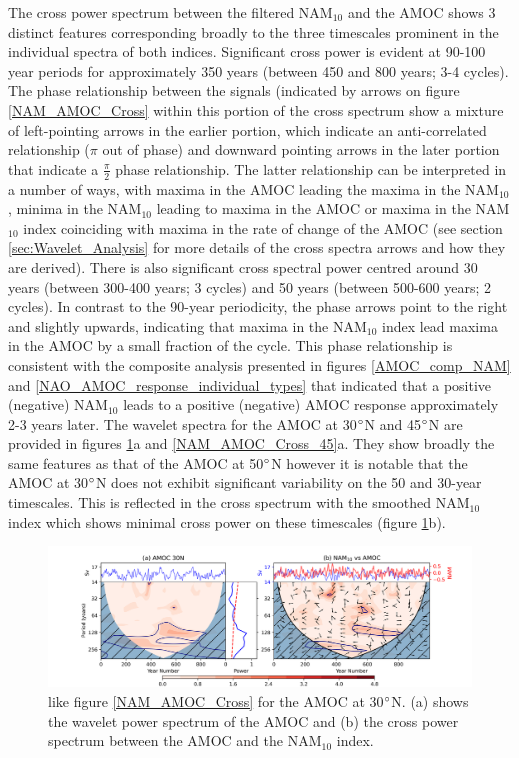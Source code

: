 The cross power spectrum between the filtered NAM$_{10}$ and the AMOC shows 3 distinct features corresponding broadly to the three timescales prominent in the individual spectra of both indices. Significant cross power is evident at 90-100 year periods for approximately 350 years (between 450 and 800 years; 3-4 cycles). The phase relationship between the signals (indicated by arrows on figure \ref{NAM_AMOC_Cross} within this portion of the cross spectrum  show a mixture of left-pointing arrows in the earlier portion, which indicate an anti-correlated relationship  ($\pi$ out of phase) and downward pointing arrows in the later portion that indicate a $\frac{\pi}{2}$ phase relationship. The latter relationship can be interpreted in a number of ways, with maxima in the AMOC leading the maxima in the NAM$_{10}$, minima in the NAM$_{10}$ leading to maxima in the AMOC or maxima in the NAM$_{10}$ index coinciding with maxima in the rate of change of the AMOC (see section \ref{sec:Wavelet_Analysis} for more details of the cross spectra arrows and how they are derived). There is also significant cross spectral power centred around 30 years (between 300-400 years; 3 cycles) and 50 years (between 500-600 years; 2 cycles). In contrast to the 90-year periodicity, the phase arrows point to the right and slightly upwards, indicating that maxima in the NAM$_{10}$ index lead maxima in the AMOC by a small fraction of the cycle. This phase relationship is consistent with the composite analysis presented in figures \ref{AMOC_comp_NAM} and \ref{NAO_AMOC_response_individual_types} that indicated that a positive (negative) NAM$_{10}$ leads to a positive (negative) AMOC response approximately 2-3 years later. The wavelet spectra for the AMOC at 30$\degree$N and 45$\degree$N are provided in figures \ref{NAM_AMOC_Cross_30}a and \ref{NAM_AMOC_Cross_45}a. They show broadly the same features as that of the AMOC at 50$\degree$N however it is notable that the AMOC at 30$\degree$N does not exhibit significant variability on the 50 and 30-year timescales. This is reflected in the cross spectrum with the smoothed NAM$_{10}$ index which shows minimal cross power on these timescales (figure \ref{NAM_AMOC_Cross_30}b). 

\begin{figure}[h!]
\begin{center}
\noindent\includegraphics[width = 0.95\linewidth]{Figures/Figures-surface/AMOC_NAM_filtered_subplot_30N.png}
\caption[Wavelet power spectrum of the AMOC at 30$\degree$N]{like figure \ref{NAM_AMOC_Cross} for the AMOC at 30$\degree$N. (a) shows the wavelet power spectrum of the AMOC and (b) the cross power spectrum between the AMOC and the NAM$_{10}$ index.}
\label{NAM_AMOC_Cross_30}
\end{center}
\end{figure}

